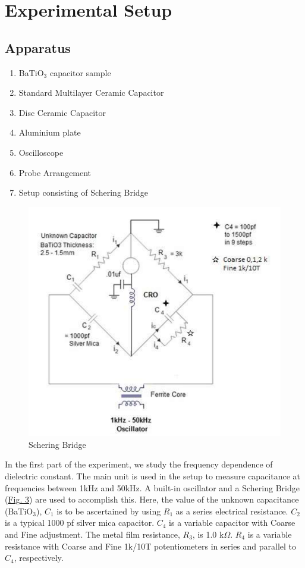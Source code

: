 \section{Experimental Setup}

\subsection*{Apparatus}

\begin{enumerate}
    \item BaTiO$_3$ capacitor sample
    \item Standard Multilayer Ceramic Capacitor
    \item Disc Ceramic Capacitor
    \item Aluminium plate
    \item Oscilloscope
    \item Probe Arrangement
    \item Setup consisting of Schering Bridge
\end{enumerate}

\begin{figure}[H]
	\centering
	\label{fig:setup}
	\includegraphics[width=0.7\columnwidth]{images/t5.png}
	\caption{Schering Bridge}
\end{figure}

In the first part of the experiment, we study the frequency dependence of dielectric constant. The main unit is used in the setup to measure capacitance at frequencies between 1kHz and 50kHz. A built-in oscillator and a Schering Bridge (\hyperref[fig:setup]{Fig. 3}) are used to accomplish this. Here, the value of the unknown capacitance (BaTiO$_3$), $C_1$ is to be ascertained by using $R_1$ as a series electrical resistance. $C_2$ is a typical 1000 pf silver mica capacitor. $C_4$ is a variable capacitor with Coarse and Fine adjustment. The metal film resistance, $R_3$, is 1.0 k$\Omega$. $R_4$ is a variable resistance with Coarse and Fine 1k/10T potentiometers in series and parallel to $C_4$, respectively. 


